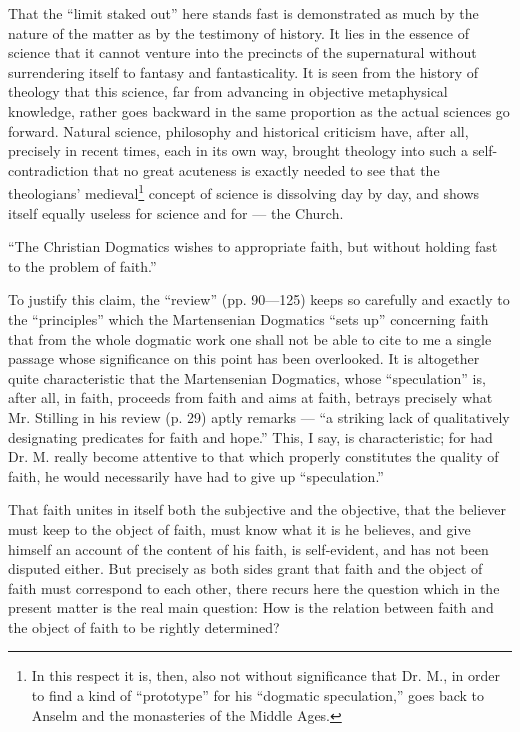 \documentclass[12pt,a4paper,openany]{book}
\newcommand{\opage}[1]{\marginnote{\footnotesize\textit{[#1]}}}
\begin{document}
That the ``limit staked out'' here stands fast is demonstrated
as much by the nature of the matter as by the testimony of history.
It lies in the essence of science that it cannot venture
into the precincts of the supernatural without surrendering itself
to fantasy and fantasticality. It is seen from the history
of theology that this science, far from advancing
in objective metaphysical knowledge, rather goes backward in
the same proportion as the actual sciences go forward.
Natural science, philosophy and historical criticism have,
after all, precisely in recent times, each in its own way, brought theology
into such a self-contradiction that no great acuteness
is exactly needed to see that the theologians' medieval\footnote[1]{In this respect it is, then, also not without significance that Dr. M., in order to find a kind of ``prototype'' for his ``dogmatic speculation,'' goes back to Anselm and the monasteries of the Middle Ages.}
concept of science is dissolving day by day, and shows
itself equally useless for science and for --- the Church.

``The Christian Dogmatics wishes to appropriate faith, but
without holding fast to the problem of faith.''

To justify this claim, the ``review'' (pp. 90—125)
keeps so carefully and exactly to
the ``principles'' which the Martensenian Dogmatics ``sets up''
concerning faith that from the whole dogmatic work one shall not
\setcounter{footnote}{0}%
\opage{58}be able to cite to me a single passage whose significance on this
point has been overlooked. It is altogether quite characteristic
that the Martensenian Dogmatics, whose ``speculation'' is, after all, in
faith, proceeds from faith and aims at faith, betrays precisely
what Mr. Stilling in his review (p. 29)
aptly remarks --- ``a striking lack of qualitatively
designating predicates for faith and hope.'' This,
I say, is characteristic; for had Dr. M. really become
attentive to that which properly constitutes the quality of faith,
he would necessarily have had to give up ``speculation.''

That faith unites in itself both the subjective and the
objective, that the believer must keep to the object of faith,
must know what it is he believes, and give himself an account
of the content of his faith, is self-evident, and has not
been disputed either. But precisely as both sides
grant that faith and the object of faith must correspond to
each other, there recurs here the question which in
the present matter is the real main question: How
is the relation between faith and the object of faith
to be rightly determined?
\end{document}
